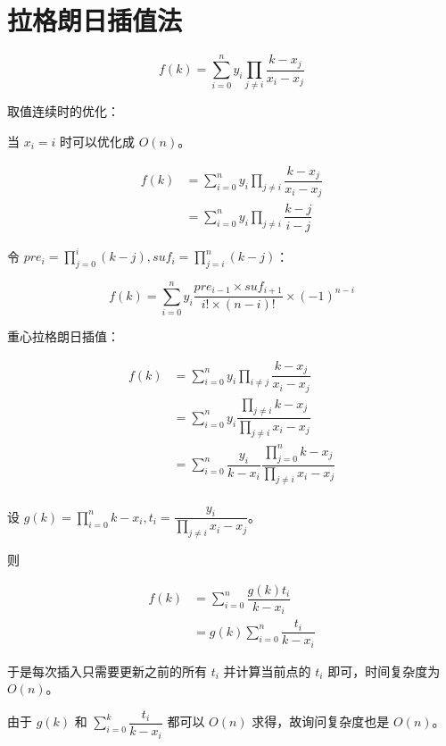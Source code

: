 \section{拉格朗日插值法}

$$
f(k) = \sum\limits_{i = 0}^n y_i \prod\limits_{j \neq i} \dfrac{k - x_j}{x_i - x_j}
$$

取值连续时的优化：

当 $x_i = i$ 时可以优化成 $O(n)$。

$$
\begin{aligned}
f(k) &= \sum\limits_{i = 0}^n y_i \prod\limits_{j \neq i} \dfrac{k - x_j}{x_i - x_j} \\
&= \sum\limits_{i = 0}^n y_i \prod\limits_{j \neq i} \dfrac{k - j}{i - j}
\end{aligned}
$$

令 $pre_i = \prod\limits_{j = 0}^i (k - j), suf_i = \prod\limits_{j = i}^n (k - j)$：

$$
f(k) = \sum\limits_{i = 0}^n y_i \dfrac{pre_{i - 1} \times suf_{i + 1}}{i! \times (n - i)!} \times (-1)^{n - i}
$$

重心拉格朗日插值：

$$
\begin{aligned}
f(k) &= \sum\limits_{i = 0}^n y_i \prod\limits_{i \neq j} \dfrac{k - x_j}{x_i - x_j} \\
&= \sum\limits_{i = 0}^n y_i \dfrac{\prod\limits_{j \neq i} k - x_j}{\prod\limits_{j \neq i} x_i - x_j} \\
&= \sum\limits_{i = 0}^n \dfrac{y_i}{k - x_i} \dfrac{\prod\limits_{j = 0}^n k - x_j}{\prod\limits_{j \neq i} x_i - x_j} \\
\end{aligned}
$$

设 $g(k) = \prod\limits_{i = 0}^n k - x_i, t_i = \dfrac{y_i}{\prod\limits_{j \neq i} x_i - x_j}$。

则

$$
\begin{aligned}
f(k) &= \sum\limits_{i = 0}^n \dfrac{g(k)t_i}{k - x_i} \\
&= g(k) \sum\limits_{i = 0}^n \dfrac{t_i}{k - x_i}
\end{aligned}
$$

于是每次插入只需要更新之前的所有 $t_i$ 并计算当前点的 $t_i$ 即可，时间复杂度为 $O(n)$。

由于 $g(k)$ 和 $\sum\limits_{i = 0}^k \dfrac{t_i}{k - x_i}$ 都可以 $O(n)$ 求得，故询问复杂度也是 $O(n)$。
